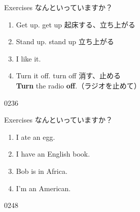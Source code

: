 \documentclass[aspectratio=169,xcolor={dvipsnames,table}]{beamer}
\begin{document}
\begin{frame}[plain]{Exercises}
  なんといっていますか？
  \Large
  \begin{enumerate}
    \item<2-> Get   up.%
          \hfill{}{\normalsize get up 起床する、立ち上がる}
    \item<4-> Stand   up.
          \hfill{}{\normalsize stand up 立ち上がる}
    \item<6-> I like   it.
    \item<8-> Turn \only<9->{\textcolor{Maroon}{\textbottomtiebar\ }}  it   off.%
          \hfill{}{\normalsize turn off 消す、止める}\\
          \hfill{}{\normalsize \textbf{Turn} the radio \textbf{off}.（ラジオを止めて）}\\
  \end{enumerate}

  \hfill{\tiny 0236}\,{\scriptsize {}}
\end{frame}
\begin{frame}[plain]{Exercises}
  なんといっていますか？
  \Large
  \begin{enumerate}
    \item<2-> I ate \only<3->{\textcolor{Maroon}{\textbottomtiebar\ }}  an   egg.
    \item<5-> I have \only<6->{\textcolor{Maroon}{\textbottomtiebar\ }}  an   English book.
    \item<8-> Bob \only<9->{\textcolor{Maroon}{\textbottomtiebar\ }}  is   in   Africa.
    \item<12-> I'm \only<13->{\textcolor{Maroon}{\textbottomtiebar\ }}  an   American.
  \end{enumerate}

  \hfill{\tiny 0248}\,{\scriptsize {}}
\end{frame}
\end{document}

